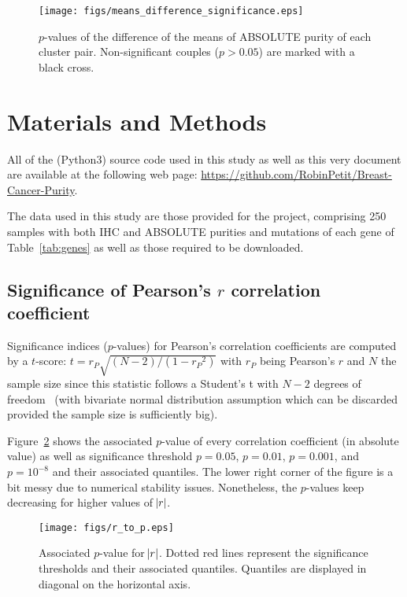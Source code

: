 \documentclass[letterpaper]{article}
\begin{document}
\begin{figure}[!h]
\texttt{[image: figs/means\_difference\_significance.eps]}
\caption{$p$-values of the difference of the means of ABSOLUTE purity of each cluster pair.
Non-significant couples ($p > 0.05$) are marked with a black cross.\label{fig:means difference significance}}
\end{figure}

\section{Materials and Methods}
All of the (Python3) source code used in this study as well as this very document are available at the following web page: \url{https://github.com/RobinPetit/Breast-Cancer-Purity}.

The data used in this study are those provided for the project, comprising 250 samples with both IHC and ABSOLUTE purities and mutations of each gene of Table~\ref{tab:genes}
as well as those required to be downloaded.

\subsection{Significance of Pearson's $r$ correlation coefficient}
Significance indices ($p$-values) for Pearson's correlation coefficients are computed by a $t$-score: $t = r_P\sqrt{(N-2)/(1-{r_P}^2)}$ with $r_P$ being Pearson's $r$ and $N$
the sample size since this statistic follows a Student's t with $N-2$ degrees of freedom~\citep{lee1988thirteen} (with bivariate normal distribution assumption which
can be discarded provided the sample size is sufficiently big).

Figure~\ref{fig:r to p} shows the associated $p$-value of every correlation coefficient (in absolute value) as well as significance threshold $p = 0.05$, $p = 0.01$, $p = 0.001$,
and $p = 10^{-8}$ and their associated quantiles. The lower right corner of the figure is a bit messy due to numerical stability issues. Nonetheless, the $p$-values keep
decreasing for higher values of $\abs r$.

\begin{figure}[!h]
\texttt{[image: figs/r\_to\_p.eps]}
\caption{Associated $p$-value for $\abs r$. Dotted red lines represent the significance thresholds and their associated quantiles. Quantiles are displayed in diagonal
on the horizontal axis.\label{fig:r to p}}
\end{figure}
\end{document}
